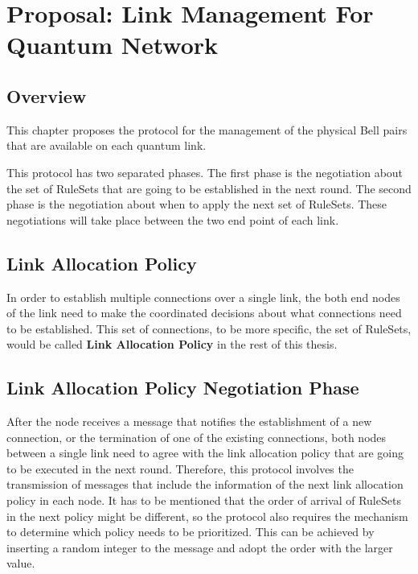 \chapter{Proposal: Link Management For Quantum Network}
\label{proposal}

\section{Overview}

This chapter proposes the protocol for the management of the physical Bell pairs that are available on each quantum link.

This protocol has two separated phases. The first phase is the negotiation about the set of RuleSets that are going to be established in the next round. The second phase is the negotiation about when to apply the next set of RuleSets.
These negotiations will take place between the two end point of each link.

\section{Link Allocation Policy}

In order to establish multiple connections over a single link, the both end nodes of the link need to make the coordinated decisions about what connections need to be established.
This set of connections, to be more specific, the set of RuleSets, would be called \textbf{Link Allocation Policy} in the rest of this thesis.

\section{Link Allocation Policy Negotiation Phase}

After the node receives a message that notifies the establishment of a new connection, or the termination of one of the existing connections, both nodes between a single link need to agree with the link allocation policy that are going to be executed in the next round.
Therefore, this protocol involves the transmission of messages that include the information of the next link allocation policy in each node.  It has to be mentioned that the order of arrival of RuleSets in the next policy might be different, so the protocol also requires the mechanism to determine which policy needs to be prioritized.
This can be achieved by inserting a random integer to the message and adopt the order with the larger value.

